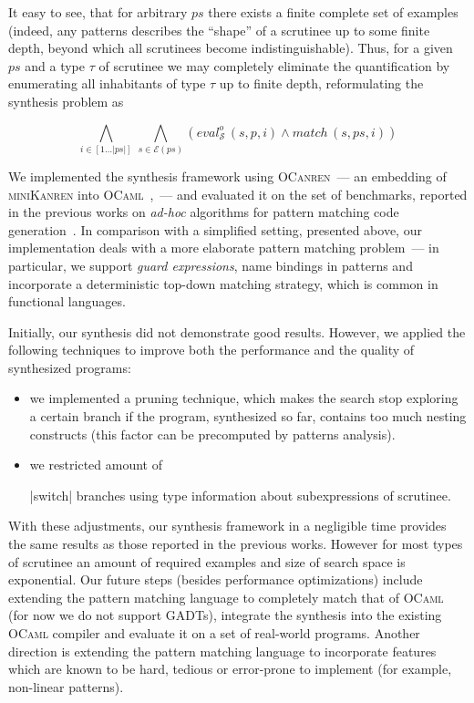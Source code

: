 \documentclass[submission,copyright,creativecommons]{eptcs}
\newcommand*{\SavedLstInline}{}
\DeclareRobustCommand*{\lstinline}{%
  \ifmmode
    \let\SavedBGroup\bgroup
    \def\bgroup{%
      \let\bgroup\SavedBGroup
      \hbox\bgroup
    }%
  \fi
  \SavedLstInline
}
\newcommand{\ir}{\ensuremath{\mathcal{S}}}
\begin{document}
It easy to see, that for arbitrary $ps$ there exists a finite complete set of examples (indeed, any patterns describes the ``shape''
of a scrutinee up to some finite depth, beyond which all scrutinees become indistinguishable). Thus, for a given $ps$ and a type $\tau$ of scrutinee we may
completely eliminate the quantification by enumerating all inhabitants of type $\tau$ up to finite depth, reformulating the synthesis problem as

\[
\bigwedge_{i\in[1\dots|ps|]}\,\bigwedge_{s\in\mathcal{E}(ps)} (eval^o_{\ir}\, (s, p, i) \wedge match\, (s, ps, i))
\]

We implemented the synthesis framework using \textsc{OCanren}~--- an embedding of \textsc{miniKanren} into \textsc{OCaml}~\cite{ocanren},~---
and evaluated it on the set of benchmarks, reported in the previous works on \emph{ad-hoc} algorithms for pattern matching
code generation~\cite{maranget2001,maranget2008}. In comparison with a simplified setting, presented above, our implementation
deals with a more elaborate pattern matching problem~--- in particular, we support \emph{guard expressions}, name bindings in
patterns and incorporate a deterministic top-down matching strategy, which is common in functional languages.

Initially, our synthesis did not demonstrate good results. However, we applied the following techniques to improve both the performance
and the quality of synthesized programs:

\begin{itemize}
\item we implemented a pruning technique, which makes the search stop exploring a certain branch if the program, synthesized so far,
  contains too much nesting constructs (this factor can be precomputed by patterns analysis).
  
\item we restricted amount of \lstinline|switch| branches using type information about subexpressions of scrutinee.
\end{itemize}

With these adjustments, our synthesis framework in a negligible time provides the same results as those reported in the previous works. However for most types of scrutinee an amount of required examples and size of search space is  exponential.
Our future steps (besides performance optimizations) include extending the pattern matching language to completely match that of \textsc{OCaml} (for
now we do not support GADTs), integrate the synthesis into the existing \textsc{OCaml} compiler and evaluate it on a
set of real-world programs. Another direction is extending the pattern matching language to incorporate features which
are known to be hard, tedious or error-prone to implement (for example, non-linear patterns).
\end{document}
